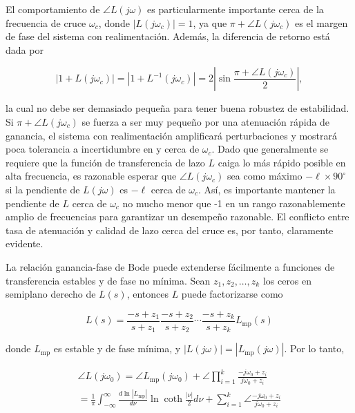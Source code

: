 El comportamiento de $\angle L(j \omega)$ es particularmente importante cerca de la frecuencia de cruce $\omega_{c}$, donde $\left|L\left(j \omega_{c}\right)\right|=1$, ya que $\pi+\angle L\left(j \omega_{c}\right)$ es el margen de fase del sistema con realimentación. Además, la diferencia de retorno está dada por

$$
\left|1+L\left(j \omega_{c}\right)\right|=\left|1+L^{-1}\left(j \omega_{c}\right)\right|=2\left|\sin \frac{\pi+\angle L\left(j \omega_{c}\right)}{2}\right|,
$$

la cual no debe ser demasiado pequeña para tener buena robustez de estabilidad. Si $\pi+\angle L\left(j \omega_{c}\right)$ se fuerza a ser muy pequeño por una atenuación rápida de ganancia, el sistema con realimentación amplificará perturbaciones y mostrará poca tolerancia a incertidumbre en y cerca de $\omega_{c}$. Dado que generalmente se requiere que la función de transferencia de lazo $L$ caiga lo más rápido posible en alta frecuencia, es razonable esperar que $\angle L\left(j \omega_{c}\right)$ sea como máximo $-\ell \times 90^{\circ}$ si la pendiente de $L(j \omega)$ es $-\ell$ cerca de $\omega_{c}$. Así, es importante mantener la pendiente de $L$ cerca de $\omega_{c}$ no mucho menor que -1 en un rango razonablemente amplio de frecuencias para garantizar un desempeño razonable. El conflicto entre tasa de atenuación y calidad de lazo cerca del cruce es, por tanto, claramente evidente.

La relación ganancia-fase de Bode puede extenderse fácilmente a funciones de transferencia estables y de fase no mínima. Sean $z_{1}, z_{2}, \ldots, z_{k}$ los ceros en semiplano derecho de $L(s)$, entonces $L$ puede factorizarse como

$$
L(s)=\frac{-s+z_{1}}{s+z_{1}} \frac{-s+z_{2}}{s+z_{2}} \cdots \frac{-s+z_{k}}{s+z_{k}} L_{\mathrm{mp}}(s)
$$

donde $L_{\mathrm{mp}}$ es estable y de fase mínima, y $|L(j \omega)|=\left|L_{\mathrm{mp}}(j \omega)\right|$. Por lo tanto,

$$
\begin{gathered}
\angle L\left(j \omega_{0}\right)=\angle L_{\mathrm{mp}}\left(j \omega_{0}\right)+\angle \prod_{i=1}^{k} \frac{-j \omega_{0}+z_{i}}{j \omega_{0}+z_{i}} \\
=\frac{1}{\pi} \int_{-\infty}^{\infty} \frac{d \ln \left|L_{\mathrm{mp}}\right|}{d \nu} \ln \operatorname{coth} \frac{|\nu|}{2} d \nu+\sum_{i=1}^{k} \angle \frac{-j \omega_{0}+z_{i}}{j \omega_{0}+z_{i}}
\end{gathered}
$$

